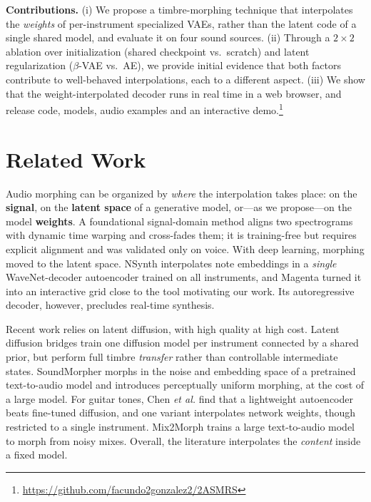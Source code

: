 \documentclass{article}
\begin{document}
\noindent\textbf{Contributions.} (i) We propose a timbre-morphing technique that
interpolates the \emph{weights} of per-instrument specialized VAEs, rather than
the latent code of a single shared model, and evaluate it on four sound sources.
(ii) Through a $2\times2$ ablation over initialization (shared checkpoint vs.\
scratch) and latent regularization ($\beta$-VAE vs.\ AE), we provide initial
evidence that both factors contribute to well-behaved interpolations, each to a
different aspect. (iii) We show that the weight-interpolated decoder runs in
real time in a web browser, and release code, models, audio examples and an
interactive demo.\footnote{\url{https://github.com/facundo2gonzalez2/2ASMRS}}

\section{Related Work}\label{sec:related}

Audio morphing can be organized by \emph{where} the interpolation takes place:
on the \textbf{signal}, on the \textbf{latent space} of a generative model,
or---as we propose---on the model \textbf{weights}. A foundational signal-domain
method \cite{slaney1996audiomorphing} aligns two spectrograms with dynamic time
warping and cross-fades them; it is training-free but requires explicit
alignment and was validated only on voice. With deep learning, morphing moved to
the latent space. NSynth \cite{engel2017nsynth} interpolates note embeddings in a
\emph{single} WaveNet-decoder autoencoder trained on all instruments, and Magenta
turned it into an interactive grid \cite{magenta2017nsynthsoundmaker} close to the
tool motivating our work. Its autoregressive decoder, however, precludes
real-time synthesis.

Recent work relies on latent diffusion, with high quality at high cost. Latent
diffusion bridges \cite{mancusi2025latentbridges} train one diffusion model per
instrument connected by a shared prior, but perform full timbre \emph{transfer}
rather than controllable intermediate states. SoundMorpher
\cite{niu2024soundmorpher} morphs in the noise and embedding space of a
pretrained text-to-audio model and introduces perceptually uniform morphing, at
the cost of a large model. For guitar tones, Chen \emph{et al.}
\cite{chen2025guitartonemorphing} find that a lightweight autoencoder beats
fine-tuned diffusion, and one variant interpolates network weights, though
restricted to a single instrument. Mix2Morph \cite{chu2026mix2morph} trains a
large text-to-audio model to morph from noisy mixes. Overall, the literature
interpolates the \emph{content} inside a fixed model.
\end{document}
